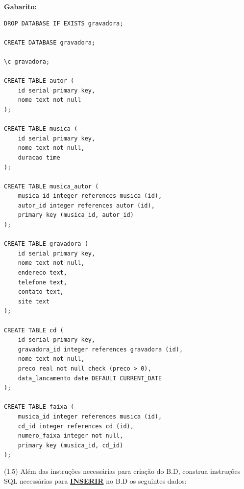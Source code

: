 \documentclass[12pt]{exam}
\begin{document}
\begin{questions}
\textbf{Gabarito:}
\begin{verbatim}
DROP DATABASE IF EXISTS gravadora;

CREATE DATABASE gravadora;

\c gravadora;

CREATE TABLE autor (
    id serial primary key,
    nome text not null
);

CREATE TABLE musica (
    id serial primary key,
    nome text not null,
    duracao time
);

CREATE TABLE musica_autor (
    musica_id integer references musica (id),
    autor_id integer references autor (id),
    primary key (musica_id, autor_id)
);

CREATE TABLE gravadora (
    id serial primary key,
    nome text not null,
    endereco text,
    telefone text,
    contato text,
    site text
);

CREATE TABLE cd (
    id serial primary key,
    gravadora_id integer references gravadora (id),
    nome text not null,
    preco real not null check (preco > 0),
    data_lancamento date DEFAULT CURRENT_DATE
);

CREATE TABLE faixa (
    musica_id integer references musica (id),
    cd_id integer references cd (id),
    numero_faixa integer not null,
    primary key (musica_id, cd_id)
);
\end{verbatim}

\question (1.5) Além das instruções necessárias para criação do B.D, construa instruções SQL necessárias para \textbf{\underline{INSERIR}} no B.D os seguintes dados:


\end{questions}
\end{document}
